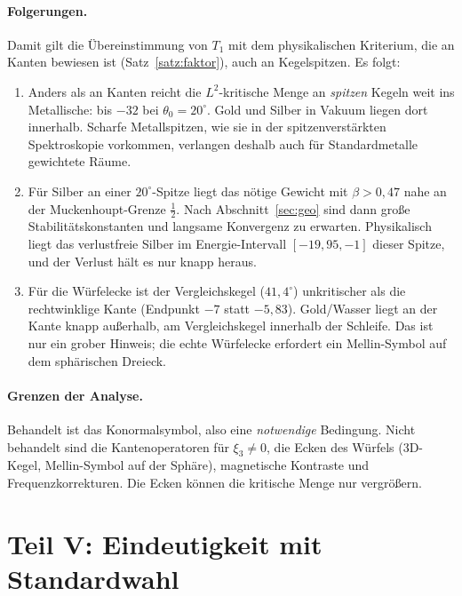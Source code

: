 \documentclass[11pt, a4paper]{article}
\theoremstyle{plain}
\theoremstyle{definition}
\begin{document}
\paragraph{Folgerungen.} Damit gilt die Übereinstimmung von $T_1$ mit dem
physikalischen Kriterium, die an Kanten bewiesen ist (Satz~\ref{satz:faktor}), auch an
Kegelspitzen. Es folgt:
\begin{enumerate}[leftmargin=*]
  \item Anders als an Kanten reicht die $L^2$-kritische Menge an \emph{spitzen}
    Kegeln weit ins Metallische: bis $-32$ bei $\theta_0=20^\circ$. Gold und Silber in
    Vakuum liegen dort innerhalb. Scharfe Metallspitzen, wie sie in der
    spitzenverstärkten Spektroskopie vorkommen, verlangen deshalb auch für
    Standardmetalle gewichtete Räume.
  \item Für Silber an einer $20^\circ$-Spitze liegt das nötige Gewicht mit
    $\beta>0{,}47$ nahe an der Muckenhoupt-Grenze $\tfrac12$. Nach
    Abschnitt~\ref{sec:geo} sind dann große Stabilitätskonstanten und langsame
    Konvergenz zu erwarten. Physikalisch liegt das verlustfreie Silber im
    Energie-Intervall $[-19{,}95,-1]$ dieser Spitze, und der Verlust hält es nur knapp
    heraus.
  \item Für die Würfelecke ist der Vergleichskegel ($41{,}4^\circ$) unkritischer als
    die rechtwinklige Kante (Endpunkt $-7$ statt $-5{,}83$). Gold/Wasser liegt an der Kante knapp außerhalb, am
    Vergleichskegel innerhalb der Schleife. Das ist nur ein grober Hinweis; die echte
    Würfelecke erfordert ein Mellin-Symbol auf dem sphärischen Dreieck.
\end{enumerate}

\paragraph{Grenzen der Analyse.} Behandelt ist das Konormalsymbol, also eine
\emph{notwendige} Bedingung. Nicht behandelt sind die Kantenoperatoren für
$\xi_3\neq0$, die Ecken des Würfels (3D-Kegel, Mellin-Symbol auf der Sphäre),
magnetische Kontraste und Frequenzkorrekturen. Die Ecken können die kritische Menge
nur vergrößern.

\section{Teil V: Eindeutigkeit mit Standardwahl}\label{sec:teil5}
\end{document}

